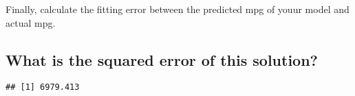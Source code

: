 \documentclass[]{article}
\newenvironment{Shaded}{\begin{snugshade}}{\end{snugshade}}
\newcommand{\KeywordTok}[1]{\textcolor[rgb]{0.13,0.29,0.53}{\textbf{{#1}}}}
\newcommand{\DecValTok}[1]{\textcolor[rgb]{0.00,0.00,0.81}{{#1}}}
\newcommand{\StringTok}[1]{\textcolor[rgb]{0.31,0.60,0.02}{{#1}}}
\newcommand{\CommentTok}[1]{\textcolor[rgb]{0.56,0.35,0.01}{\textit{{#1}}}}
\newcommand{\NormalTok}[1]{{#1}}
\begin{document}
Finally, calculate the fitting error between the predicted mpg of youur
model and actual mpg.

\subsection{What is the squared error of this
solution?}\label{what-is-the-squared-error-of-this-solution-1}

\begin{Shaded}
\end{Shaded}

\begin{verbatim}
## [1] 6979.413
\end{verbatim}
\end{document}
